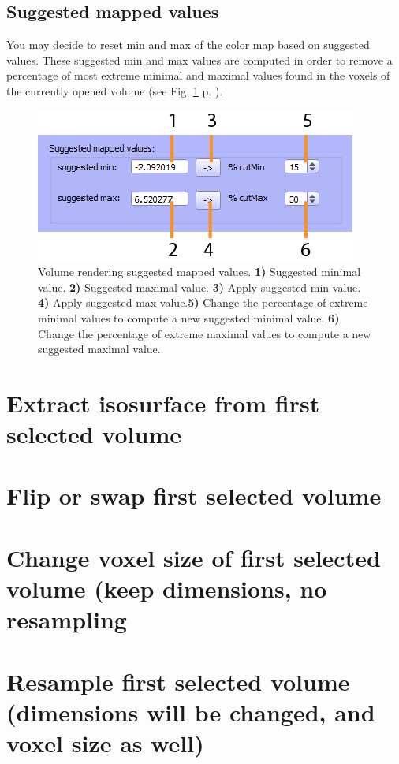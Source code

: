 \subsection{Suggested mapped values}
You may decide to reset min and max of the color map based on suggested values. These suggested min and max values are computed in order to remove a percentage of most extreme minimal and maximal values found in the voxels of the currently opened volume (see Fig. \ref{volume_suggested_values} p. \pageref{volume_suggested_values}).
\begin{figure}
  \centering
  \includegraphics[scale=1]{images/14/volume_suggested_values2.png}
\caption{Volume rendering suggested mapped values. \textbf{1)} Suggested minimal value. \textbf{2)} Suggested maximal value. \textbf{3)} Apply suggested min value.  \textbf{4)} Apply suggested max value.\textbf{5)} Change the percentage of extreme minimal values to compute a new suggested minimal value. \textbf{6)} Change the percentage of extreme maximal values to compute a new suggested maximal value.}	
\label{volume_suggested_values}
 \end{figure}


\section{Extract isosurface from first selected volume}

\section{Flip or swap first selected volume}

\section{Change voxel size of first selected volume (keep dimensions, no resampling}

\section{Resample first selected volume (dimensions will be changed, and voxel size as well)}

